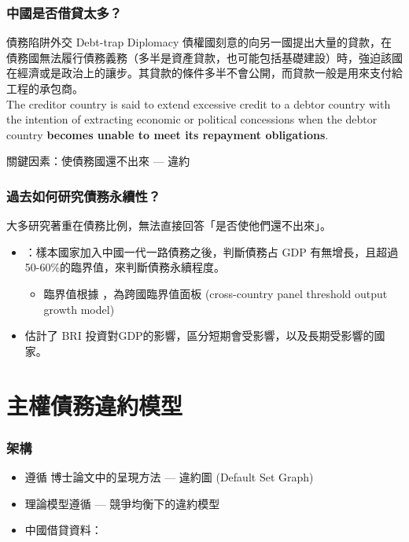 \documentclass[mathserif]{beamer}
\begin{document}
    \begin{frame}
        \frametitle{中國是否借貸太多？}
            \begin{block}{債務陷阱外交 Debt-trap Diplomacy}
               債權國刻意的向另一國提出大量的貸款，在債務國無法履行債務義務（多半是資產貸款，也可能包括基礎建設）時，強迫該國在經濟或是政治上的讓步。其貸款的條件多半不會公開，而貸款一般是用來支付給工程的承包商。\\
               The creditor country is said to extend excessive credit to a debtor country with the intention of extracting economic or political concessions when the debtor country \textbf{becomes unable to meet its repayment obligations}.
            \end{block}
            \pause
            \vfill
            關鍵因素：使債務國還不出來 --- 違約
    \end{frame}

    \begin{frame}
        \frametitle{過去如何研究債務永續性？}
            大多研究著重在債務比例，無法直接回答「是否使他們還不出來」。
            \vfill
            \pause
            \begin{itemize}
            \item \citet{Hurley19-8-debt-trap}：樣本國家加入中國一代一路債務之後，判斷債務占 GDP 有無增長，且超過50-60\%的臨界值，來判斷債務永續程度。
                \begin{itemize}
                    \item 臨界值根據 \citet{Chudik-15}，為跨國臨界值面板 (cross-country panel threshold output growth model)
                \end{itemize}
            \item \citet{Bandiera-Vasileios-BRI-debt} 估計了 BRI 投資對GDP的影響，區分短期會受影響，以及長期受影響的國家。
            \end{itemize}
    \end{frame}

    \section{主權債務違約模型}
    \begin{frame}
        \frametitle{架構}
        \begin{itemize}
            \item 遵循 \citet{Hinrichsen_2020-chapter4}博士論文中的呈現方法 --- 違約圖 (Default Set Graph)
            \item 理論模型遵循 \citet*{Na-18} --- 競爭均衡下的違約模型
            \item 中國借貸資料：\citet*{Horn-Reinhart-Trebesch-21}
        \end{itemize}
    \end{frame}
\end{document}

